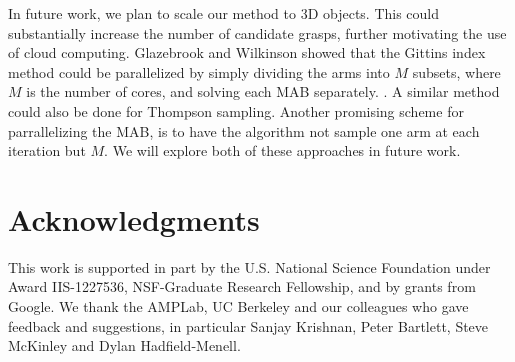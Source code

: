 \documentclass[10pt, conference]{ieeeconf}      %
\begin{document}
In future work, we plan to scale our method to 3D objects. This could substantially increase the number of candidate grasps, further motivating the use of cloud computing. Glazebrook and Wilkinson showed that the Gittins index method could be parallelized by simply dividing the arms into $M$ subsets, where $M$ is the number of cores, and solving each MAB separately. \cite{glazebrook2000index}. A similar method could also be done for Thompson sampling. Another promising scheme for parrallelizing the MAB, is to have the algorithm not sample one arm at each iteration but $M$. We will explore both of these approaches in future work.

\section{Acknowledgments} 
This work is supported in part by the U.S. National Science Foundation under Award IIS-1227536, NSF-Graduate Research Fellowship, and by grants from Google. 
We thank the AMPLab, UC Berkeley and our colleagues who gave feedback and suggestions, in particular Sanjay Krishnan, Peter Bartlett, Steve McKinley and Dylan Hadfield-Menell.



\end{document}
